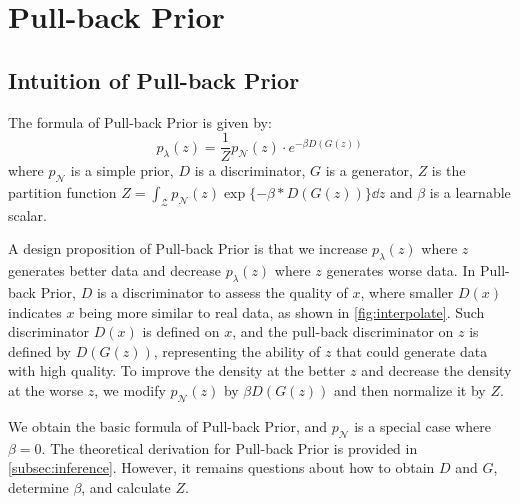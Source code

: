 
\section{Pull-back Prior}\label{sec:pull_back_prior}

\subsection{Intuition of Pull-back Prior}\label{subsec:intuition}

The formula of Pull-back Prior is given by:
\begin{equation}\label{eq:pull_back_prior}
	p_\lambda(z) = \frac{1}{Z} p_\mathcal{N}(z) \cdot e^{- \beta D(G(z))} \tag{4}
\end{equation}
where $p_\mathcal{N}$ is a simple prior, $D$ is a discriminator, $G$ is a generator, $Z$ is the partition function $Z = \int_{\mathcal{Z}} p_\mathcal{N}(z) \exp\{- \beta * D(G(z))\} \dd z$ and $\beta$ is a learnable scalar.

A design proposition of Pull-back Prior is that we increase $p_\lambda(z)$ where $z$ generates better data and decrease $p_\lambda(z)$ where $z$ generates worse data. In Pull-back Prior, 
$D$ is a discriminator to assess the quality of $x$, where smaller $D(x)$ indicates $x$ being more similar to real data, as shown in \cref{fig:interpolate}. Such discriminator $D(x)$ is defined on $x$, and the pull-back discriminator on $z$ is defined by $D(G(z))$, representing the ability of $z$ that could generate data with high quality. To improve the density at the better $z$ and decrease the density at the worse $z$, we modify $p_\mathcal{N}(z)$ by $\beta D(G(z))$ and then normalize it by $Z$. 

We obtain the basic formula of Pull-back Prior, and $p_\mathcal{N}$ is a special case where $\beta = 0$. The theoretical derivation for Pull-back Prior is provided in \cref{subsec:inference}. However, it remains questions about how to obtain $D$ and $G$, determine $\beta$, and calculate $Z$. 

